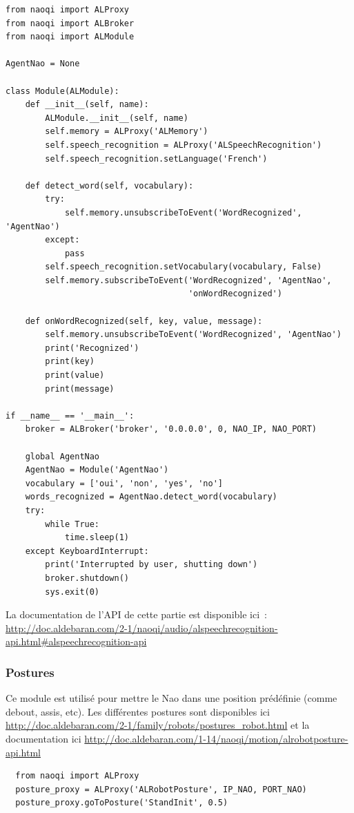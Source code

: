 \documentclass{article}
\begin{document}
\begin{verbatim}
from naoqi import ALProxy
from naoqi import ALBroker
from naoqi import ALModule

AgentNao = None

class Module(ALModule):
    def __init__(self, name):
        ALModule.__init__(self, name)
        self.memory = ALProxy('ALMemory')
        self.speech_recognition = ALProxy('ALSpeechRecognition')
        self.speech_recognition.setLanguage('French')

    def detect_word(self, vocabulary):
        try:
            self.memory.unsubscribeToEvent('WordRecognized', 'AgentNao')
        except:
            pass
        self.speech_recognition.setVocabulary(vocabulary, False)
        self.memory.subscribeToEvent('WordRecognized', 'AgentNao',
                                     'onWordRecognized')

    def onWordRecognized(self, key, value, message):
        self.memory.unsubscribeToEvent('WordRecognized', 'AgentNao')
        print('Recognized')
        print(key)
        print(value)
        print(message)

if __name__ == '__main__':
    broker = ALBroker('broker', '0.0.0.0', 0, NAO_IP, NAO_PORT)

    global AgentNao
    AgentNao = Module('AgentNao')
    vocabulary = ['oui', 'non', 'yes', 'no']
    words_recognized = AgentNao.detect_word(vocabulary)
    try:
        while True:
            time.sleep(1)
    except KeyboardInterrupt:
        print('Interrupted by user, shutting down')
        broker.shutdown()
        sys.exit(0)
\end{verbatim}



La documentation de l'API de cette partie est disponible ici~: \url{http://doc.aldebaran.com/2-1/naoqi/audio/alspeechrecognition-api.html#alspeechrecognition-api}


\subsubsection{Postures}

Ce module est utilisé pour mettre le Nao dans une position prédéfinie (comme debout, assis, etc). Les différentes postures sont disponibles ici \url{http://doc.aldebaran.com/2-1/family/robots/postures_robot.html} et la documentation ici \url{http://doc.aldebaran.com/1-14/naoqi/motion/alrobotposture-api.html}

\begin{verbatim}
  from naoqi import ALProxy
  posture_proxy = ALProxy('ALRobotPosture', IP_NAO, PORT_NAO)
  posture_proxy.goToPosture('StandInit', 0.5)
\end{verbatim}
\end{document}
